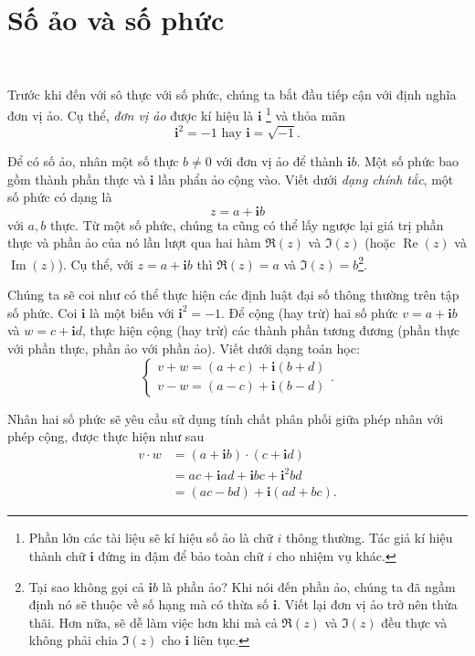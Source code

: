 \documentclass[a4paper, titlepage, openany]{book}
\begin{document}
\section{Số ảo và số phức}

\ %

Trước khi đến với sô thực với số phức, chúng ta bắt đầu tiếp cận với định nghĩa đơn vị ảo. Cụ thể, \emph{đơn vị ảo} được kí hiệu là $\mathbf{i}$ \footnote{Phần lớn các tài liệu sẽ kí hiệu số ảo là chữ $i$ thông thường. Tác giả kí hiệu thành chữ $\mathbf{i}$ đứng in đậm để bảo toàn chữ $i$ cho nhiệm vụ khác.} và thỏa mãn $$\mathbf{i}^2 = -1 \text{ hay } \mathbf{i} = \sqrt{-1}.$$

Để có số ảo, nhân một số thực $b \neq 0$ với đơn vị ảo để thành $\mathbf{i}b$. Một số phức bao gồm thành phần thực và $\mathbf{i}$ lần phẩn ảo cộng vào. Viết dưới \emph{dạng chính tắc}, một số phức có dạng là $$z=a+\mathbf{i}b$$ với $a, b$ thực. Từ một số phức, chúng ta cũng có thể lấy ngược lại giá trị phần thực và phần ảo của nó lần lượt qua hai hàm $\Re{(z)}$ và $\Im{(z)}$ (hoặc $\operatorname*{Re}{(z)}$ và $\operatorname*{Im}{(z)}$). Cụ thể, với $z=a+\mathbf{i}b$ thì $\Re{(z)} = a$ và $\Im{(z)}=b$\footnote{Tại sao không gọi cả $\mathbf{i}b$ là phần ảo? Khi nói đến phần ảo, chúng ta đã ngầm định nó sẽ thuộc về số hạng mà có thừa số $\mathbf{i}$. Viết lại đơn vị ảo trở nên thừa thãi. Hơn nữa, sẽ dễ làm việc hơn khi mà cả $\Re{(z)}$ và $\Im{(z)}$ đều thực và không phải chia $\Im{(z)}$ cho $\mathbf{i}$ liên tục.}.

Chúng ta sẽ coi như có thể thực hiện các định luật đại số thông thường trên tập số phức. Coi $\mathbf{i}$ là một biến với $\mathbf{i}^2 = -1$. Để cộng (hay trừ) hai số phức $v = a + \mathbf{i}b$ và $w = c + \mathbf{i}d$, thực hiện cộng (hay trừ) các thành phần tương đương (phần thực với phần thực, phần ảo với phần ảo). Viết dưới dạng toán học:
\begin{equation*}
   \begin{cases}
      v + w = (a + c) + \mathbf{i}(b + d) \\ 
      v - w = (a - c) + \mathbf{i}(b - d) 
   \end{cases}.
\end{equation*}

Nhân hai số phức sẽ yêu cầu sử dụng tính chất phân phối giữa phép nhân với phép cộng, được thực hiện như sau
\begin{align*}
   v\cdot w&=\left(a + \mathbf{i}b\right)\cdot\left(c + \mathbf{i}d\right) \\
      &= ac + \mathbf{i}ad + \mathbf{i}bc + \mathbf{i}^2 bd \\
      &= (ac - bd) + \mathbf{i}(ad + bc).
\end{align*}
\end{document}
